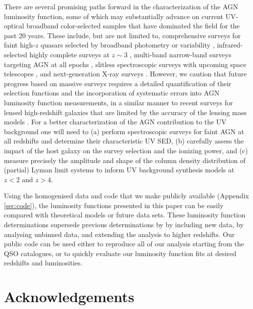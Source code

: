 \documentclass[fleqn,usenatbib]{mnras}
\begin{document}
There are several promising paths forward in the characterization of
the AGN luminosity function, some of which may substantially advance
on current UV-optical broadband color-selected samples that have
dominated the field for the past 20 years.  These include, but are not
limited to, comprehensive surveys for faint high-$z$ quasars selected
by broadband photometry \citep{2016ApJ...828...26M,
  2017ApJ...839...27W} or variability \citep{2017MNRAS.464.1693H},
infrared-selected highly complete surveys at $z\sim 3$
\citep{2017ApJ...851...13S, 2018AJ....155..110Y}, multi-band
narrow-band surveys targeting AGN at all epochs
\citep{2014arXiv1403.5237B}, slitless spectroscopic surveys with
upcoming space telescopes \citep{2011arXiv1110.3193L,
  2013arXiv1305.5422S}, and next-generation X-ray surveys
\citep[e.g.][]{2013A&A...558A..89K}. However, we caution that future
progress based on massive surveys requires a detailed quantification
of their selection functions and the incorporation of systematic
errors into AGN luminosity function measurements, in a similar manner
to recent surveys for lensed high-redshift galaxies that are limited
by the accuracy of the lensing mass models \citep{2017ApJ...843..129B,
  2018ApJ...854...73I, 2018arXiv180309747A}.  For a better
characterization of the AGN contribution to the UV background one will
need to (a) perform spectroscopic surveys for faint AGN at all
redshifts and determine their characteristic UV SED, (b) carefully
assess the impact of the host galaxy on the survey selection and the
ionizing power, and (c) measure precisely the amplitude and shape of
the column density distribution of (partial)  Lyman limit
systems to inform UV background synthesis models at $z<2$ and $z>4$.

Using the homogenised data and code that we make publicly available
(Appendix \ref{sec:code}), the luminosity functions presented in this
paper can be easily compared with theoretical models or future data
sets.  These luminosity function determinations supersede previous
determinations by \citet{2007ApJ...654..731H} by including new data,
by analysing unbinned data, and extending the analysis to higher
redshifts.  Our public code can be used either to reproduce all of our
analysis starting from the QSO catalogues, or to quickly evaluate our
luminosity function fits at desired redshifts and luminosities.  

\section*{Acknowledgements}
\end{document}
